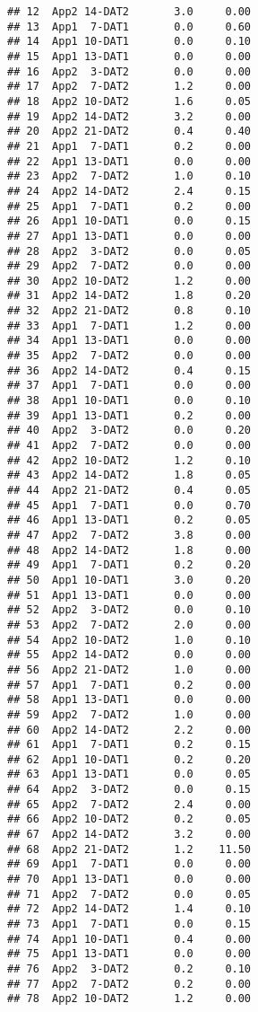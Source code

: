 \documentclass[
]{article}
\begin{document}
\begin{verbatim}
## 12  App2 14-DAT2       3.0     0.00
## 13  App1  7-DAT1       0.0     0.60
## 14  App1 10-DAT1       0.0     0.10
## 15  App1 13-DAT1       0.0     0.00
## 16  App2  3-DAT2       0.0     0.00
## 17  App2  7-DAT2       1.2     0.00
## 18  App2 10-DAT2       1.6     0.05
## 19  App2 14-DAT2       3.2     0.00
## 20  App2 21-DAT2       0.4     0.40
## 21  App1  7-DAT1       0.2     0.00
## 22  App1 13-DAT1       0.0     0.00
## 23  App2  7-DAT2       1.0     0.10
## 24  App2 14-DAT2       2.4     0.15
## 25  App1  7-DAT1       0.2     0.00
## 26  App1 10-DAT1       0.0     0.15
## 27  App1 13-DAT1       0.0     0.00
## 28  App2  3-DAT2       0.0     0.05
## 29  App2  7-DAT2       0.0     0.00
## 30  App2 10-DAT2       1.2     0.00
## 31  App2 14-DAT2       1.8     0.20
## 32  App2 21-DAT2       0.8     0.10
## 33  App1  7-DAT1       1.2     0.00
## 34  App1 13-DAT1       0.0     0.00
## 35  App2  7-DAT2       0.0     0.00
## 36  App2 14-DAT2       0.4     0.15
## 37  App1  7-DAT1       0.0     0.00
## 38  App1 10-DAT1       0.0     0.10
## 39  App1 13-DAT1       0.2     0.00
## 40  App2  3-DAT2       0.0     0.20
## 41  App2  7-DAT2       0.0     0.00
## 42  App2 10-DAT2       1.2     0.10
## 43  App2 14-DAT2       1.8     0.05
## 44  App2 21-DAT2       0.4     0.05
## 45  App1  7-DAT1       0.0     0.70
## 46  App1 13-DAT1       0.2     0.05
## 47  App2  7-DAT2       3.8     0.00
## 48  App2 14-DAT2       1.8     0.00
## 49  App1  7-DAT1       0.2     0.20
## 50  App1 10-DAT1       3.0     0.20
## 51  App1 13-DAT1       0.0     0.00
## 52  App2  3-DAT2       0.0     0.10
## 53  App2  7-DAT2       2.0     0.00
## 54  App2 10-DAT2       1.0     0.10
## 55  App2 14-DAT2       0.0     0.00
## 56  App2 21-DAT2       1.0     0.00
## 57  App1  7-DAT1       0.2     0.00
## 58  App1 13-DAT1       0.0     0.00
## 59  App2  7-DAT2       1.0     0.00
## 60  App2 14-DAT2       2.2     0.00
## 61  App1  7-DAT1       0.2     0.15
## 62  App1 10-DAT1       0.2     0.20
## 63  App1 13-DAT1       0.0     0.05
## 64  App2  3-DAT2       0.0     0.15
## 65  App2  7-DAT2       2.4     0.00
## 66  App2 10-DAT2       0.2     0.05
## 67  App2 14-DAT2       3.2     0.00
## 68  App2 21-DAT2       1.2    11.50
## 69  App1  7-DAT1       0.0     0.00
## 70  App1 13-DAT1       0.0     0.00
## 71  App2  7-DAT2       0.0     0.05
## 72  App2 14-DAT2       1.4     0.10
## 73  App1  7-DAT1       0.0     0.15
## 74  App1 10-DAT1       0.4     0.00
## 75  App1 13-DAT1       0.0     0.00
## 76  App2  3-DAT2       0.2     0.10
## 77  App2  7-DAT2       0.2     0.00
## 78  App2 10-DAT2       1.2     0.00

\end{verbatim}
\end{document}
